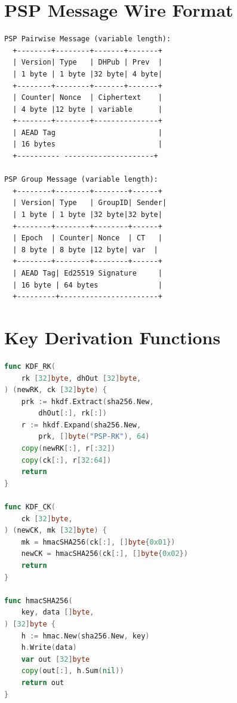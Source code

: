 \documentclass[11pt,a4paper]{article}
\begin{document}
\appendix

\section{PSP Message Wire Format}
\label{app:wire}

\begin{lstlisting}[caption={Binary Wire Format}]
PSP Pairwise Message (variable length):
  +--------+--------+-------+-------+
  | Version| Type   | DHPub | Prev  |
  | 1 byte | 1 byte |32 byte| 4 byte|
  +--------+--------+-------+-------+
  | Counter| Nonce  | Ciphertext    |
  | 4 byte |12 byte | variable      |
  +--------+--------+---------------+
  | AEAD Tag                        |
  | 16 bytes                        |
  +---------- ---------------------+

PSP Group Message (variable length):
  +--------+--------+--------+------+
  | Version| Type   | GroupID| Sender|
  | 1 byte | 1 byte |32 byte|32 byte|
  +--------+--------+--------+------+
  | Epoch  | Counter| Nonce  | CT   |
  | 8 byte | 8 byte |12 byte| var  |
  +--------+--------+--------+------+
  | AEAD Tag| Ed25519 Signature     |
  | 16 byte | 64 bytes              |
  +---------+-----------------------+
\end{lstlisting}

\section{Key Derivation Functions}
\label{app:kdf}

\begin{lstlisting}[language=Go,caption={KDF Implementations}]
func KDF_RK(
    rk [32]byte, dhOut [32]byte,
) (newRK, ck [32]byte) {
    prk := hkdf.Extract(sha256.New,
        dhOut[:], rk[:])
    r := hkdf.Expand(sha256.New,
        prk, []byte("PSP-RK"), 64)
    copy(newRK[:], r[:32])
    copy(ck[:], r[32:64])
    return
}

func KDF_CK(
    ck [32]byte,
) (newCK, mk [32]byte) {
    mk = hmacSHA256(ck[:], []byte{0x01})
    newCK = hmacSHA256(ck[:], []byte{0x02})
    return
}

func hmacSHA256(
    key, data []byte,
) [32]byte {
    h := hmac.New(sha256.New, key)
    h.Write(data)
    var out [32]byte
    copy(out[:], h.Sum(nil))
    return out
}
\end{lstlisting}
\end{document}
